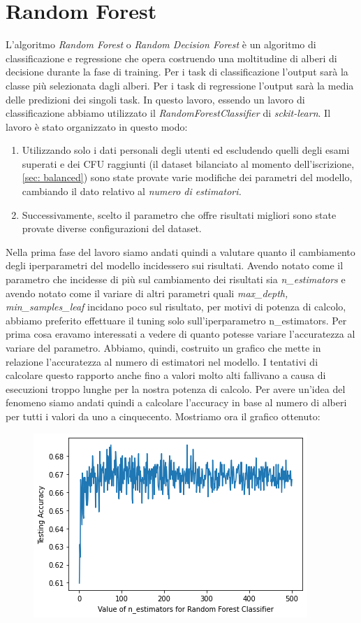 \documentclass[../Report.tex]{subfiles}
\begin{document}
    \section{Random Forest}
    L'algoritmo \emph{Random Forest} o \emph{Random Decision Forest} è un algoritmo di classificazione e regressione che opera costruendo una moltitudine di alberi di decisione durante la fase di training. Per i task di classificazione l'output sarà la classe più selezionata dagli alberi. Per i task di regressione l'output sarà la media delle predizioni dei singoli task. In questo lavoro, essendo un lavoro di classificazione abbiamo utilizzato il \emph{RandomForestClassifier} di \emph{sckit-learn}.
    Il lavoro è stato organizzato in questo modo:
    \begin{enumerate}
        \item Utilizzando solo i dati personali degli utenti ed escludendo quelli degli esami superati e dei CFU raggiunti (il dataset bilanciato al momento dell'iscrizione, \ref{sec: balanced}) sono state provate varie modifiche dei parametri del modello, cambiando il dato relativo al \emph{numero di estimatori.}
        \item Successivamente, scelto il parametro che offre risultati migliori sono state provate diverse configurazioni del dataset. 
    \end{enumerate}
    Nella prima fase del lavoro siamo andati quindi a valutare quanto il cambiamento degli iperparametri del modello incidessero sui risultati. Avendo notato come il parametro che incidesse di più sul cambiamento dei risultati sia \emph{n\_estimators} e avendo notato come il variare di altri parametri quali \emph{max\_depth, min\_samples\_leaf} incidano poco sul risultato, per motivi di potenza di calcolo, abbiamo preferito effettuare il tuning solo sull'iperparametro n\_estimators. Per prima cosa eravamo interessati a vedere di quanto potesse variare l'accuratezza al variare del parametro. Abbiamo, quindi, costruito un  grafico che mette in relazione l'accuratezza al numero di estimatori  nel modello. I tentativi di calcolare questo rapporto anche fino a valori molto alti fallivano a causa di esecuzioni troppo lunghe per la nostra potenza di calcolo. Per avere un'idea del fenomeno siamo andati quindi a calcolare l'accuracy in base al numero di alberi per tutti i valori da uno a cinquecento. Mostriamo ora il grafico ottenuto:
    \begin{figure}[H]
        \includegraphics[width=0.7\linewidth]{../../Images/AccuracyvsNestimatorns.png}
        \centering
    \end{figure}
\end{document}
